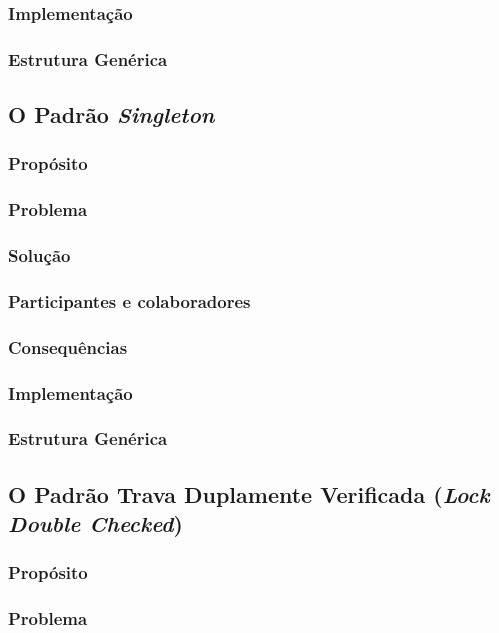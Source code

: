 \documentclass[
	11pt,				%
	openright,
	twoside,			%
	a4paper,			%
	english,			%
	french,
	brazil,				%
	sumario=tradicional
	]{abntex2}
\begin{document}
\subsubsection{Implementação}
\subsubsection{Estrutura Genérica}

\subsection{O Padrão \textit{Singleton}}
\subsubsection{Propósito}
\subsubsection{Problema}
\subsubsection{Solução}
\subsubsection{Participantes e colaboradores}
\subsubsection{Consequências}
\subsubsection{Implementação}
\subsubsection{Estrutura Genérica}

\subsection{O Padrão Trava Duplamente Verificada (\textit{Lock Double Checked})}
\subsubsection{Propósito}
\subsubsection{Problema}
\end{document}
